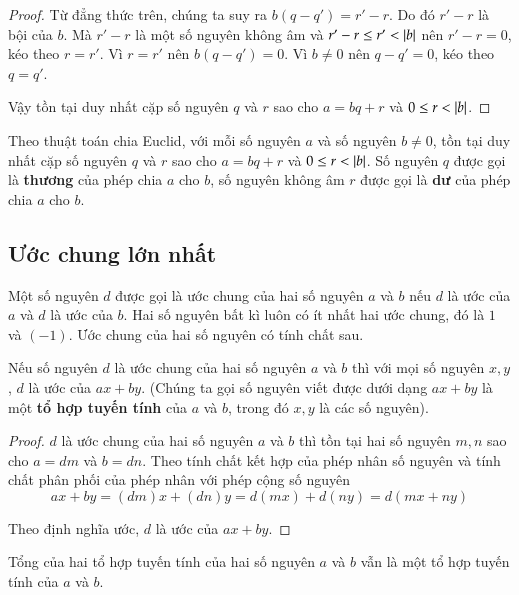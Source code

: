 \begin{proof}
	Từ đẳng thức trên, chúng ta suy ra $b(q - q') = r' - r$. Do đó $r' - r$ là bội của $b$. Mà $r' - r$ là một số nguyên không âm và $r' - r\leq r' < \left\vert{b}\right\vert$ nên $r' - r = 0$, kéo theo $r = r'$. Vì $r = r'$ nên $b(q - q') = 0$. Vì $b\ne 0$ nên $q - q' = 0$, kéo theo $q = q'$.

	Vậy tồn tại duy nhất cặp số nguyên $q$ và $r$ sao cho $a = bq + r$ và $0\leq r < \left\vert{b}\right\vert$.
\end{proof}

\begin{definition}[Thương và Dư]
	Theo thuật toán chia Euclid, với mỗi số nguyên $a$ và số nguyên $b\ne 0$, tồn tại duy nhất cặp số nguyên $q$ và $r$ sao cho $a = bq + r$ và $0\leq r < \left\vert{b}\right\vert$. Số nguyên $q$ được gọi là \textbf{thương} của phép chia $a$ cho $b$, số nguyên không âm $r$ được gọi là \textbf{dư} của phép chia $a$ cho $b$.
\end{definition}

\subsection*{Ước chung lớn nhất}

Một số nguyên $d$ được gọi là ước chung của hai số nguyên $a$ và $b$ nếu $d$ là ước của $a$ và $d$ là ước của $b$. Hai số nguyên bất kì luôn có ít nhất hai ước chung, đó là $1$ và $(-1)$. Ước chung của hai số nguyên có tính chất sau.

\begin{theorem}\label{theorem:linear-combination-and-common-divisor}
	Nếu số nguyên $d$ là ước chung của hai số nguyên $a$ và $b$ thì với mọi số nguyên $x, y$, $d$ là ước của $ax + by$. (Chúng ta gọi số nguyên viết được dưới dạng $ax + by$ là một \textbf{tổ hợp tuyến tính} của $a$ và $b$, trong đó $x, y$ là các số nguyên).
\end{theorem}

\begin{proof}
	$d$ là ước chung của hai số nguyên $a$ và $b$ thì tồn tại hai số nguyên $m, n$ sao cho $a = dm$ và $b = dn$. Theo tính chất kết hợp của phép nhân số nguyên và tính chất phân phối của phép nhân với phép cộng số nguyên
	\[
		ax + by = (dm)x + (dn)y = d(mx) + d(ny) = d(mx + ny)
	\]

	Theo định nghĩa ước, $d$ là ước của $ax + by$.
\end{proof}

Tổng của hai tổ hợp tuyến tính của hai số nguyên $a$ và $b$ vẫn là một tổ hợp tuyến tính của $a$ và $b$.


